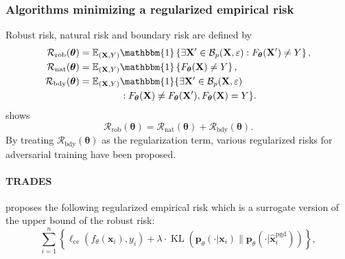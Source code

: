 \documentclass[nohyperref]{article}
\theoremstyle{plain}
\theoremstyle{definition}
\theoremstyle{remark}
\begin{document}
\subsubsection{Algorithms minimizing a regularized empirical risk}
\label{al_reg}
Robust risk, natural risk and boundary risk are defined by 
\begin{align*}
    \mathcal{R}_{\text{rob}}(\bm{\theta}) &= \mathbb{E}_{(\mathbf{X}, Y)}\mathbbm{1}\left\{\exists \mathbf{X}'\in \mathcal{B}_p(\mathbf{X}, \varepsilon) : F_{\bm{\theta}}(\mathbf{X}') \neq Y \right\},  \\
    \mathcal{R}_{\text{nat}}(\bm{\theta}) &= \mathbb{E}_{(\mathbf{X}, Y)}\mathbbm{1}\left\{ F_{\bm{\theta}}(\mathbf{X}) \neq Y \right\},\\
    \mathcal{R}_{\text{bdy}}(\bm{\theta}) &= \mathbb{E}_{(\mathbf{X}, Y)}\mathbbm{1}\{\exists \mathbf{X}' \in \mathcal{B}_p(\mathbf{X}, \varepsilon) \\ 
    & \qquad\qquad\; : F_{\bm{\theta}}(\mathbf{X})\neq F_{\bm{\theta}}(\mathbf{X}'), F_{\bm{\theta}}(\mathbf{X}) = Y   \}.
\end{align*}
\citet{zhang2019theoretically} shows 
\begin{equation*}
    \mathcal{R}_{\text{rob}}(\bm{\theta}) = \mathcal{R}_{\text{nat}}(\bm{\theta}) + \mathcal{R}_{\text{bdy}}(\bm{\theta}).
\end{equation*}
By treating $\mathcal{R}_{\text{bdy}}(\bm{\theta})$ as the regularization term,
various regularized risks for adversarial training have been proposed.

\paragraph{TRADES}
\citet{zhang2019theoretically} proposes the following regularized empirical risk which is a surrogate version of the upper bound of the robust risk:
\begin{equation*}
\label{trades}
    \sum\limits_{i=1}^n \left\{ \ell_{\text{ce}}(f_{\theta}(\bm{x}_i), y_i) + \lambda \cdot \operatorname{KL} (\mathbf{p}_{\theta }(\cdot|\bm{x}_i)\lVert \mathbf{p}_{\theta }(\cdot|\widehat{\bm{x}}^{\text{pgd}}_i))\right\},
\end{equation*}
\end{document}
